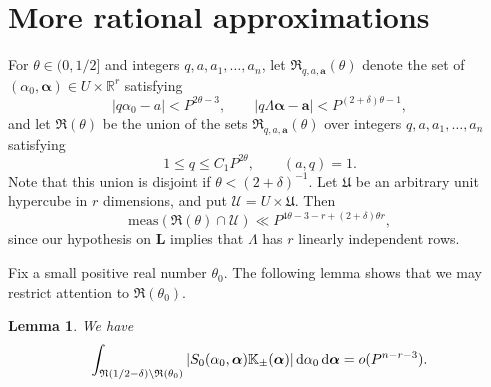 \documentclass[12pt,reqno]{amsart}
\newtheorem{lemma}[thm]{Lemma}
\theoremstyle{definition}
\theoremstyle{remark}
\numberwithin{equation}{section}
\begin{document}
\section{More rational approximations}
\label{MoreRational}

For ${{\theta}} \in (0,1/2]$ and integers $q,a,a_1,\ldots,a_n$, let ${\mathfrak R}_{q,a,{\mathbf a}}({{\theta}})$ denote the set of $({{\alpha}}_0,{\boldsymbol{{\alpha}}}) \in U \times {\mathbb R}^r$ satisfying
\begin{equation} \label{R1}
|q{{\alpha}}_0 - a| < P^{2 {{\theta}} - 3}, \qquad |q {{\Lambda}} {\boldsymbol{{\alpha}}} - {\mathbf a}| < P^{(2+{{\delta}}) {{\theta}} - 1},
\end{equation}
and let ${\mathfrak R}({{\theta}})$ be the union of the sets ${\mathfrak R}_{q,a,{\mathbf a}}({{\theta}})$ over integers $q,a,a_1,\ldots,a_n$ satisfying
\begin{equation} \label{R2}
1 {\leqslant} q {\leqslant} C_1 P^{2{{\theta}}}, \qquad (a,q) = 1.
\end{equation}
Note that this union is disjoint if ${{\theta}} < (2+{{\delta}})^{-1}$. Let ${\mathfrak U}$ be an arbitrary unit hypercube in $r$ dimensions, and put ${\mathcal U} = U \times {\mathfrak U}$. Then
\[
{\mathrm{meas}}({\mathfrak R}({{\theta}}) \cap {\mathcal U}) \ll P^{4 {{\theta}} - 3 - r + (2+{{\delta}}) {{\theta}} r},
\]
since our hypothesis on ${\mathbf L}$ implies that ${{\Lambda}}$ has $r$ linearly independent rows.

Fix a small positive real number ${{\theta}}_0$. The following lemma shows that we may restrict attention to ${\mathfrak R}({{\theta}}_0)$.

\begin{lemma} We have
\[
\int_{{\mathfrak N}(1/2-{{\delta}}) \setminus {\mathfrak R}({{\theta}}_0)} |S_0({{\alpha}}_0,{\boldsymbol{{\alpha}}}) {\mathbb K}_\pm({\boldsymbol{{\alpha}}})| {{\,{\rm d}}} {{\alpha}}_0 {{\,{\rm d}}} {\boldsymbol{{\alpha}}} = o(P^{n-r-3}).
\]
\end{lemma}
\end{document}
